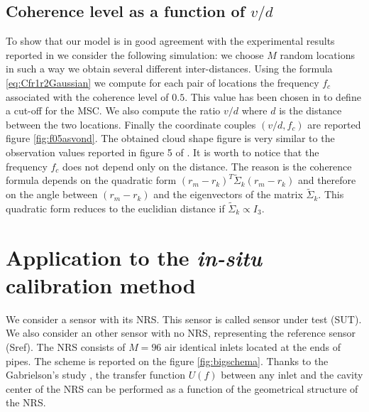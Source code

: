 \subsection{Coherence level as a function of $v/d$}

To show that our model is in good agreement with the experimental results reported in  \cite{alcoverro:2005} we  consider the following simulation: we choose $M$ random locations in such a way we obtain several different inter-distances. Using the formula \eqref{eq:Cfr1r2Gaussian} we compute for each pair of locations the frequency $f_{c}$ associated with the coherence level of $0.5$. This value has been chosen in  \cite{alcoverro:2005} to define a cut-off for the MSC. We also compute the ratio $v/d$ where $d$ is the distance between the two locations. Finally the coordinate couples $(v/d,f_{c})$ are reported figure \ref{fig:f05asvond}. The obtained cloud shape figure is very similar to the observation values reported in
figure 5 of \cite{alcoverro:2005}. It is worth to notice that the frequency $f_{c}$ does not depend only on the distance. The reason is the coherence formula depends on the quadratic form $(r_m-r_k)^{T}\tilde \Sigma_{k}(r_m-r_k)$ and therefore on the angle between $(r_m-r_k)$ and the  eigenvectors of the matrix  $\tilde \Sigma_{k}$. This quadratic form reduces to the euclidian distance if $\tilde \Sigma_{k}\propto I_{3}$. 


 \newpage
 \section{Application to the {\it in-situ} calibration method}



	We consider a sensor with its NRS. This sensor is called sensor under test (SUT). We also consider an other sensor with no NRS, representing the reference sensor (Sref). The NRS consists  of $M=96$ air identical inlets located at the ends of pipes. The scheme is reported on the figure \ref{fig:bigschema}. Thanks to the  Gabrielson's study \cite{gabrielson:2011}, the transfer function $U(f)$ between any inlet and the cavity center of the NRS can be performed as a function of the geometrical structure of the NRS.

